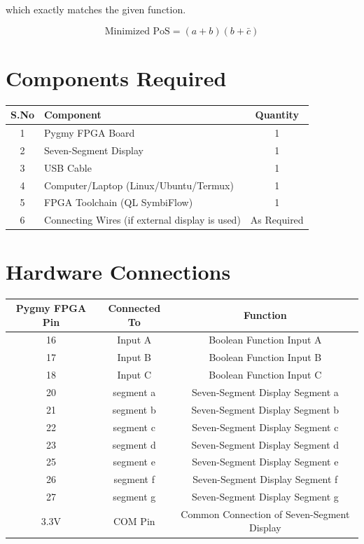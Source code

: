 \documentclass[12pt,a4paper]{article}
\begin{document}
which exactly matches the given function.

$$
\boxed{\text{Minimized PoS}=(a+b)(b+\bar{c})}
$$
\section*{Components Required}

\begin{center}
\begin{tabular}{|c|l|c|}
\hline
\textbf{S.No} & \textbf{Component} & \textbf{Quantity} \\
\hline
1 & Pygmy FPGA Board & 1 \\
\hline
2 & Seven-Segment Display & 1 \\
\hline
3 & USB Cable & 1 \\
\hline
4 & Computer/Laptop (Linux/Ubuntu/Termux) & 1 \\
\hline
5 & FPGA Toolchain (QL SymbiFlow) & 1 \\
\hline
6 & Connecting Wires (if external display is used) & As Required \\
\hline
\end{tabular}
\end{center}
\section*{Hardware Connections}

\begin{center}
\begin{tabular}{|c|c|c|}
\hline
\textbf{Pygmy FPGA Pin} & \textbf{Connected To} & \textbf{Function} \\
\hline
16 & Input A & Boolean Function Input A \\
\hline
17 & Input B & Boolean Function Input B \\
\hline
18 & Input C & Boolean Function Input C \\
\hline
20 & segment a & Seven-Segment Display Segment a \\
\hline
21 & segment b & Seven-Segment Display Segment b \\
\hline
22 & segment c & Seven-Segment Display Segment c \\
\hline
23 & segment d & Seven-Segment Display Segment d \\
\hline
25 & segment e & Seven-Segment Display Segment e \\
\hline
26 & segment f & Seven-Segment Display Segment f \\
\hline
27 & segment g & Seven-Segment Display Segment g \\
\hline
3.3V & COM Pin & Common Connection of Seven-Segment Display \\
\hline
\end{tabular}
\end{center}
\end{document}
